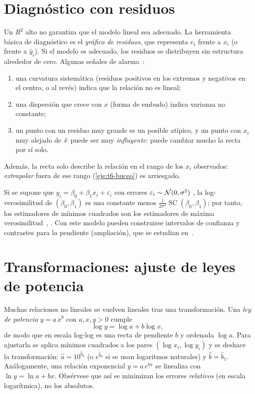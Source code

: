\section{Diagnóstico con residuos}

Un $R^{2}$ alto no garantiza que el modelo lineal sea adecuado. La herramienta básica de diagnóstico es el \emph{gráfico de residuos}, que representa $e_i$ frente a $x_i$ (o frente a $\widehat y_i$). Si el modelo es adecuado, los residuos se distribuyen sin estructura alrededor de cero. Algunas señales de alarma~\cite[§12.3]{openstax}:
\begin{enumerate}
  \item una curvatura sistemática (residuos positivos en los extremos y negativos en el centro, o al revés) indica que la relación no es lineal;
  \item una dispersión que crece con $x$ (forma de embudo) indica varianza no constante;
  \item un punto con un residuo muy grande es un posible atípico, y un punto con $x_i$ muy alejado de $\bar{x}$ puede ser muy \emph{influyente}: puede cambiar mucho la recta por sí solo.
\end{enumerate}
Además, la recta solo describe la relación en el rango de los $x_i$ observados: \emph{extrapolar} fuera de ese rango (\cref{eje:t6-buceo}) es arriesgado.

\begin{observacion}\label{obs:t6-modelo}
Si se supone que $y_i=\beta_0+\beta_1x_i+\varepsilon_i$ con errores $\varepsilon_i\sim\mathcal{N}(0,\sigma^{2})$ \iid, la log-verosimilitud de $(\beta_0,\beta_1)$ es una constante menos $\frac{1}{2\sigma^{2}}\operatorname{SC}(\beta_0,\beta_1)$; por tanto, los estimadores de mínimos cuadrados son los estimadores de máxima verosimilitud~\cite[cap.~13]{wasserman}, \cite[\emph{problem set}~6]{mit1805}. Con este modelo pueden construirse intervalos de confianza y contrastes para la pendiente (ampliación), que se estudian en~\cite[cap.~14]{rice}.
\end{observacion}

\section{Transformaciones: ajuste de leyes de potencia}

Muchas relaciones no lineales se vuelven lineales tras una transformación. Una \emph{ley de potencia} $y=a\,x^{b}$ con $a,x,y>0$ cumple
\[
\log y=\log a+b\log x,
\]
de modo que en escala log-log es una recta de pendiente $b$ y ordenada $\log a$. Para ajustarla se aplica mínimos cuadrados a los pares $(\log x_i,\log y_i)$ y se deshace la transformación: $\widehat a=10^{\widehat b_0}$ (o $e^{\widehat b_0}$ si se usan logaritmos naturales) y $\widehat b=\widehat b_1$. Análogamente, una relación exponencial $y=a\,e^{bx}$ se linealiza con $\ln y=\ln a+bx$. Obsérvese que así se minimizan los errores \emph{relativos} (en escala logarítmica), no los absolutos.

